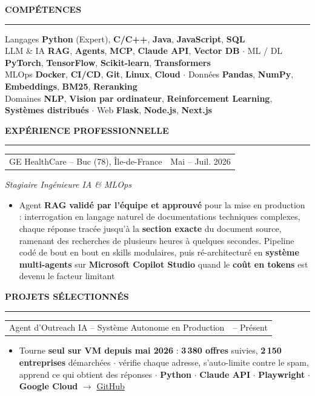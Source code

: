 \documentclass[10pt, a4paper]{article}
\makeatletter
\newcommand{\headfont}{\sffamily}
\newlength{\mainInner}\setlength{\mainInner}{\textwidth}
\providecommand{\cvFit}{1.0}
\newlength{\cvgap}
\newcommand{\vgap}[1]{\setlength{\cvgap}{#1}\vspace{\cvFit\cvgap}}
\newcommand{\mainSection}[1]{%
  \vgap{6pt}%
  {\headfont\color{sectionColor}\fontsize{10pt}{11.5pt}\selectfont\bfseries\MakeUppercase{#1}}\par%
  \nointerlineskip\vgap{2pt}%
  {\color{ruleColor}\rule{\mainInner}{0.8pt}}\par\vgap{4pt}%
}
\newcommand{\cvEntry}[4]{%
  \begin{tabularx}{\mainInner}{@{}X r@{}}
    {\headfont\fontsize{10pt}{11.5pt}\selectfont #1} &
    {\headfont\color{mutedText}\fontsize{8.5pt}{10pt}\selectfont #3}
  \end{tabularx}\par\vspace{1pt}%
  {\color{subtitleColor}\fontsize{9.5pt}{10pt}\selectfont\itshape #2}\par
  #4\vgap{6pt}%
}
\newcommand{\cvProject}[3]{%
  \begin{tabularx}{\mainInner}{@{}X r@{}}
    {\headfont\fontsize{10pt}{11.5pt}\selectfont #1} &
    {\headfont\color{mutedText}\fontsize{8.5pt}{10pt}\selectfont #2}
  \end{tabularx}\par\vspace{1pt}%
  #3\vgap{5pt}%
}
\newcommand{\cvBullets}[1]{%
  \vspace{2pt}%
  \begin{itemize}[leftmargin=10pt,itemsep=1pt,topsep=0pt,partopsep=0pt,parsep=0pt,
    label={\color{gold}\small$\bullet$}]
    #1
  \end{itemize}%
}
\newcommand{\cvItem}[1]{\item{\fontsize{8.8pt}{10.8pt}\selectfont #1}}
\makeatother
\begin{document}
\begin{lrbox}{\cvMainBox}
\begin{minipage}[t]{\mainInner}
  \mainSection{Compétences}
  {\fontsize{9pt}{12.5pt}\selectfont
{\color{mutedText}Langages} \textbf{Python} (Expert), \textbf{C/C++}, \textbf{Java}, \textbf{JavaScript}, \textbf{SQL}\\
{\color{mutedText}LLM \& IA} \textbf{RAG}, \textbf{Agents}, \textbf{MCP}, \textbf{Claude API}, \textbf{Vector DB} $\cdot$ {\color{mutedText}ML / DL} \textbf{PyTorch}, \textbf{TensorFlow}, \textbf{Scikit-learn}, \textbf{Transformers}\\
{\color{mutedText}MLOps} \textbf{Docker}, \textbf{CI/CD}, \textbf{Git}, \textbf{Linux}, \textbf{Cloud} $\cdot$ {\color{mutedText}Données} \textbf{Pandas}, \textbf{NumPy}, \textbf{Embeddings}, \textbf{BM25}, \textbf{Reranking}\\
{\color{mutedText}Domaines} \textbf{NLP}, \textbf{Vision par ordinateur}, \textbf{Reinforcement Learning}, \textbf{Systèmes distribués} $\cdot$ {\color{mutedText}Web} \textbf{Flask}, \textbf{Node.js}, \textbf{Next.js}
\par
  }
  \vgap{2pt}

  \mainSection{Expérience Professionnelle}
  \cvEntry{GE HealthCare -- Buc (78), \^Ile-de-France}
    {Stagiaire Ingénieure IA \& MLOps}
    {Mai -- Juil. 2026}{%
    \cvBullets{
      \cvItem{Agent \textbf{RAG} \textbf{validé par l'équipe et approuvé} pour la mise en production : interrogation en langage naturel de documentations techniques complexes, chaque réponse tracée jusqu'à la \textbf{section exacte} du document source, ramenant des recherches de plusieurs heures à quelques secondes. Pipeline codé de bout en bout en skills modulaires, puis ré-architecturé en \textbf{système multi-agents} sur \textbf{Microsoft Copilot Studio} quand le \textbf{coût en tokens} est devenu le facteur limitant}
    }
  }

  \mainSection{Projets Sélectionnés}
  \cvProject{Agent d'Outreach IA -- Système Autonome en Production}
    {2026 -- Présent}{%
    \cvBullets{
      \cvItem{Tourne \textbf{seul sur VM depuis mai 2026} : \textbf{3\,380 offres} suivies, \textbf{2\,150 entreprises} démarchées $\cdot$ vérifie chaque adresse, s'auto-limite contre le spam, apprend ce qui obtient des réponses $\cdot$ \textbf{Python} $\cdot$ \textbf{Claude API} $\cdot$ \textbf{Playwright} $\cdot$ \textbf{Google Cloud} $\to$ \href{https://github.com/ZinebMEFTAH/stationf-outreach-agent}{GitHub}}
    }
  }


\end{minipage}
\end{lrbox}
\end{document}
